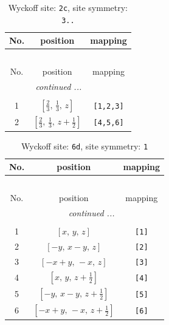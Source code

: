 \documentclass[fleqn,8pt]{jsarticle}
\begin{document}
\renewcommand{\arraystretch}{1.2}
\begin{longtable}{ccc}
\caption{Wyckoff site: {\tt 2c}, site symmetry: {\tt 3..}}
 \\
 \hline \hline
No. & position & mapping \\ \hline \endfirsthead

\multicolumn{2}{l}{\tablename\ \thetable{}} \\
 \hline \hline
No. & position & mapping \\ \hline \endhead

 \hline \hline
\multicolumn{2}{r}{\footnotesize\it continued ...} \\ \endfoot

 \hline \hline
\multicolumn{2}{r}{} \\ \endlastfoot

1 & $\left[ \frac{2}{3},\, \frac{1}{3},\, z \right]$ & {\tt [1,2,3]} \\ \hline
2 & $\left[ \frac{2}{3},\, \frac{1}{3},\, z + \frac{1}{2} \right]$ & {\tt [4,5,6]} \\
\end{longtable}
\renewcommand{\arraystretch}{1.2}
\begin{longtable}{ccc}
\caption{Wyckoff site: {\tt 6d}, site symmetry: {\tt 1}}
 \\
 \hline \hline
No. & position & mapping \\ \hline \endfirsthead

\multicolumn{2}{l}{\tablename\ \thetable{}} \\
 \hline \hline
No. & position & mapping \\ \hline \endhead

 \hline \hline
\multicolumn{2}{r}{\footnotesize\it continued ...} \\ \endfoot

 \hline \hline
\multicolumn{2}{r}{} \\ \endlastfoot

1 & $\left[ x,\, y,\, z \right]$ & {\tt [1]} \\ \hline
2 & $\left[ - y,\, x - y,\, z \right]$ & {\tt [2]} \\ \hline
3 & $\left[ - x + y,\, - x,\, z \right]$ & {\tt [3]} \\ \hline
4 & $\left[ x,\, y,\, z + \frac{1}{2} \right]$ & {\tt [4]} \\ \hline
5 & $\left[ - y,\, x - y,\, z + \frac{1}{2} \right]$ & {\tt [5]} \\ \hline
6 & $\left[ - x + y,\, - x,\, z + \frac{1}{2} \right]$ & {\tt [6]} \\
\end{longtable}
\end{document}
